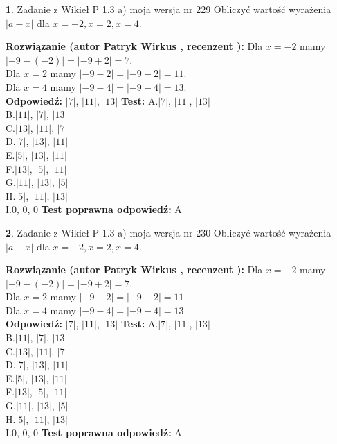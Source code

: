 \documentclass[12pt, a4paper]{article}
\theoremstyle{definition} %
\newtheorem{zad}{}
\newcommand{\zadStart}[1]{\begin{zad}#1\newline}
\newcommand{\zadStop}{\end{zad}}
\newcommand{\rozwStart}[2]{\noindent \textbf{Rozwiązanie (autor #1 , recenzent #2): }\newline}
\newcommand{\rozwStop}{\newline}
\newcommand{\odpStart}{\noindent \textbf{Odpowiedź:}\newline}
\newcommand{\odpStop}{\newline}
\newcommand{\testStart}{\noindent \textbf{Test:}\newline}
\newcommand{\testStop}{\newline}
\newcommand{\kluczStart}{\noindent \textbf{Test poprawna odpowiedź:}\newline}
\newcommand{\kluczStop}{\newline}
\begin{document}
\zadStart{Zadanie z Wikieł P 1.3 a) moja wersja nr 229}
Obliczyć wartość wyrażenia $|a - x|$ dla $x=-2,x=2,x=4$.
\zadStop
\rozwStart{Patryk Wirkus}{}
Dla $x = -2$ mamy $|-9 - (-2)| = |-9 + 2| = 7$.\\
Dla $x = 2$ mamy $|-9 - 2| = |-9 - 2| = 11$.\\
Dla $x = 4$ mamy $|-9 - 4| = |-9 - 4| = 13$.\\
\rozwStop
\odpStart
$|7|$, $|11|$, $|13|$
\odpStop
\testStart
A.$|7|$, $|11|$, $|13|$\\
B.$|11|$, $|7|$, $|13|$\\
C.$|13|$, $|11|$, $|7|$\\
D.$|7|$, $|13|$, $|11|$\\
E.$|5|$, $|13|$, $|11|$\\
F.$|13|$, $|5|$, $|11|$\\
G.$|11|$, $|13|$, $|5|$\\
H.$|5|$, $|11|$, $|13|$\\
I.$0$, $0$, $0$
\testStop
\kluczStart
A
\kluczStop



\zadStart{Zadanie z Wikieł P 1.3 a) moja wersja nr 230}
Obliczyć wartość wyrażenia $|a - x|$ dla $x=-2,x=2,x=4$.
\zadStop
\rozwStart{Patryk Wirkus}{}
Dla $x = -2$ mamy $|-9 - (-2)| = |-9 + 2| = 7$.\\
Dla $x = 2$ mamy $|-9 - 2| = |-9 - 2| = 11$.\\
Dla $x = 4$ mamy $|-9 - 4| = |-9 - 4| = 13$.\\
\rozwStop
\odpStart
$|7|$, $|11|$, $|13|$
\odpStop
\testStart
A.$|7|$, $|11|$, $|13|$\\
B.$|11|$, $|7|$, $|13|$\\
C.$|13|$, $|11|$, $|7|$\\
D.$|7|$, $|13|$, $|11|$\\
E.$|5|$, $|13|$, $|11|$\\
F.$|13|$, $|5|$, $|11|$\\
G.$|11|$, $|13|$, $|5|$\\
H.$|5|$, $|11|$, $|13|$\\
I.$0$, $0$, $0$
\testStop
\kluczStart
A
\kluczStop
\end{document}
